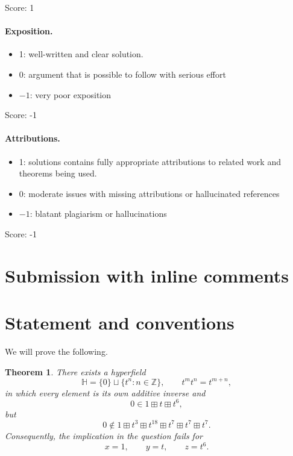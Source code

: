 \documentclass[11pt]{article}
\newcommand{\ZZ}{\mathbb{Z}}
\newcommand{\HH}{\mathbb{H}}
\newtheorem{theorem}{Theorem}
\begin{document}
\noindent Score: 1

\paragraph{Exposition.}
\begin{itemize}
	\item  1: well-written and clear solution.
	\item  0: argument that is possible to follow with serious effort
	\item  $-1$: very poor exposition
\end{itemize}

\noindent Score: -1

\paragraph{Attributions.}
\begin{itemize}
	\item  1: solutions contains fully appropriate attributions
		to related work and theorems being used.
	\item  0: moderate issues with missing attributions or hallucinated references
	\item  $-1$: blatant plagiarism or hallucinations
\end{itemize}

\noindent Score: -1

\newpage
\section{Submission with inline comments}


\begin{abstract}
The proposed implication is false for general hyperfields. We construct a
countably infinite counterexample whose multiplicative group is infinite
cyclic. The construction uses an explicitly defined infinite difference set.
All required incidence properties and all hyperfield axioms are verified
directly.
\end{abstract}

\section{Statement and conventions}

We will prove the following.

\begin{theorem}\label{thm:main}
There exists a hyperfield
\[
    \HH=\{0\}\sqcup\{t^n:n\in\ZZ\},
    \qquad t^m t^n=t^{m+n},
\]
in which every element is its own additive inverse and
\[
    0\in 1\boxplus t\boxplus t^6,
\]
but
\[
    0\notin
    1\boxplus t^3\boxplus t^{18}
      \boxplus t^7\boxplus t^7\boxplus t^7.
\]
Consequently, the implication in the question fails for
\[
    x=1,\qquad y=t,\qquad z=t^6.
\]
\end{theorem}
\end{document}
